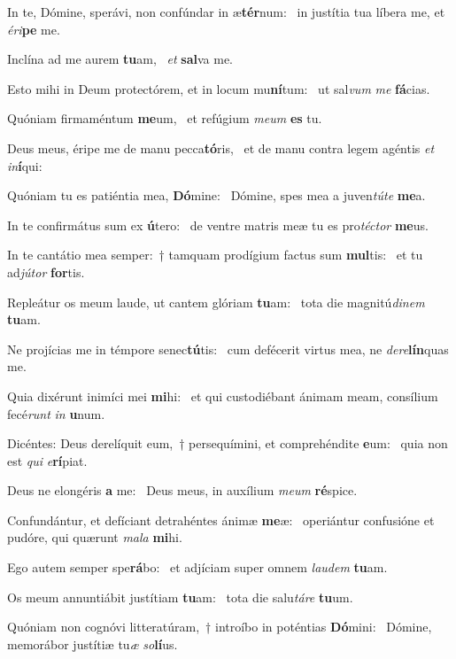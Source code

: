 \item In te, Dómine, sperávi, non confúndar in æ\textbf{tér}num:~\psstar{} in justítia tua líbera me, et \textit{éri}\textbf{pe} me.
\item Inclína ad me aurem \textbf{tu}am,~\psstar{} \textit{et} \textbf{sal}va me.
\item Esto mihi in Deum protectórem, et in locum mu\textbf{ní}tum:~\psstar{} ut sal\textit{vum} \textit{me} \textbf{fá}cias.
\item Quóniam firmaméntum \textbf{me}um,~\psstar{} et refúgium \textit{meum} \textbf{es} tu.
\item Deus meus, éripe me de manu pecca\textbf{tó}ris,~\psstar{} et de manu contra legem agéntis \textit{et} \textit{in}\textbf{í}qui:
\item Quóniam tu es patiéntia mea, \textbf{Dó}mine:~\psstar{} Dómine, spes mea a juven\textit{túte} \textbf{me}a.
\item In te confirmátus sum ex \textbf{ú}tero:~\psstar{} de ventre matris meæ tu es pro\textit{téctor} \textbf{me}us.
\item In te cantátio mea semper:~† tamquam prodígium factus sum \textbf{mul}tis:~\psstar{} et tu ad\textit{jútor} \textbf{for}tis.
\item Repleátur os meum laude, ut cantem glóriam \textbf{tu}am:~\psstar{} tota die magnitú\textit{dinem} \textbf{tu}am.
\item Ne projícias me in témpore senec\textbf{tú}tis:~\psstar{} cum defécerit virtus mea, ne \textit{dere}\textbf{lín}quas me.
\item Quia dixérunt inimíci mei \textbf{mi}hi:~\psstar{} et qui custodiébant ánimam meam, consílium fecé\textit{runt} \textit{in} \textbf{u}num.
\item Dicéntes: Deus derelíquit eum,~† persequímini, et comprehéndite \textbf{e}um:~\psstar{} quia non est \textit{qui} \textit{e}\textbf{rí}piat.
\item Deus ne elongéris \textbf{a} me:~\psstar{} Deus meus, in auxílium \textit{meum} \textbf{ré}spice.
\item Confundántur, et defíciant detrahéntes ánimæ \textbf{me}æ:~\psstar{} operiántur confusióne et pudóre, qui quærunt \textit{mala} \textbf{mi}hi.
\item Ego autem semper spe\textbf{rá}bo:~\psstar{} et adjíciam super omnem \textit{laudem} \textbf{tu}am.
\item Os meum annuntiábit justítiam \textbf{tu}am:~\psstar{} tota die salu\textit{táre} \textbf{tu}um.
\item Quóniam non cognóvi litteratúram,~† introíbo in poténtias \textbf{Dó}mini:~\psstar{} Dómine, memorábor justítiæ tu\textit{æ} \textit{so}\textbf{lí}us.
